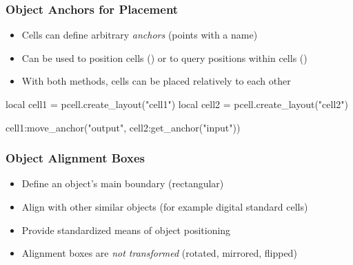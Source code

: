 \documentclass[aspectratio=169, dvipsnames, x11names, svgnames, 11pt]{beamer}
\begin{document}
\begin{frame}[fragile]
    \frametitle{Object Anchors for Placement}
    \begin{itemize}
        \item Cells can define arbitrary \emph{anchors} (points with a name)
        \item Can be used to position cells () or to query positions within cells ()
        \item With both methods, cells can be placed relatively to each other
    \end{itemize}
    \vfill
    \begin{luacode}
        local cell1 = pcell.create_layout("cell1")
        local cell2 = pcell.create_layout("cell2")

        cell1:move_anchor("output", cell2:get_anchor("input"))
    \end{luacode}
\end{frame}

\begin{frame}
    \frametitle{Object Alignment Boxes}
    \begin{itemize}
        \item Define an object's main boundary (rectangular)
        \item Align with other similar objects (for example digital standard cells)
        \item Provide standardized means of object positioning
        \item Alignment boxes are \emph{not transformed} (rotated, mirrored, flipped)
    \end{itemize}
    \vfill
    \centering
\end{frame}
\end{document}
